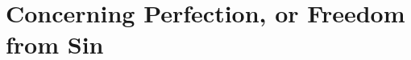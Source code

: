 \documentclass[../main.tex]{subfiles}
\begin{document}
	
	\chapter{Concerning Perfection, or Freedom from Sin}
	
	
	
	\theendnotes
	\setcounter{endnote}{0}
\end{document}
